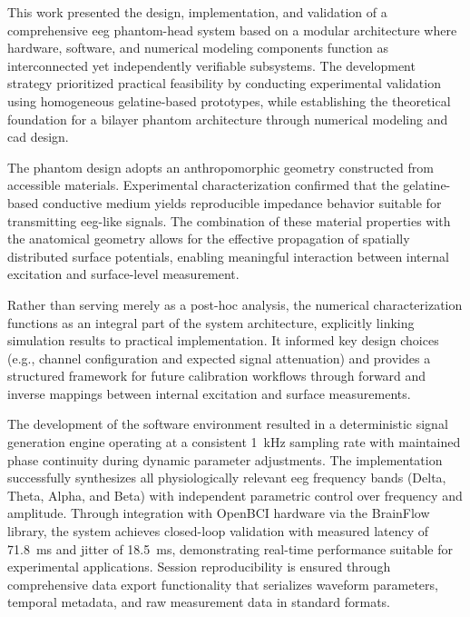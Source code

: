 \documentclass[../00_Main.tex]{subfiles}
\begin{document}
This work presented the design, implementation, and validation of a comprehensive \gls{eeg} phantom-head system based on a modular architecture where hardware, software, and numerical modeling components function as interconnected yet independently verifiable subsystems. The development strategy prioritized practical feasibility by conducting experimental validation using homogeneous gelatine-based prototypes, while establishing the theoretical foundation for a bilayer phantom architecture through numerical modeling and \gls{cad} design.

The phantom design adopts an anthropomorphic geometry constructed from accessible materials. Experimental characterization confirmed that the gelatine-based conductive medium yields reproducible impedance behavior suitable for transmitting \gls{eeg}-like signals. The combination of these material properties with the anatomical geometry allows for the effective propagation of spatially distributed surface potentials, enabling meaningful interaction between internal excitation and surface-level measurement.

Rather than serving merely as a post-hoc analysis, the numerical characterization functions as an integral part of the system architecture, explicitly linking simulation results to practical implementation. It informed key design choices (e.g., channel configuration and expected signal attenuation) and provides a structured framework for future calibration workflows through forward and inverse mappings between internal excitation and surface measurements.

The development of the software environment resulted in a deterministic signal generation engine operating at a consistent 1~kHz sampling rate with maintained phase continuity during dynamic parameter adjustments. The implementation successfully synthesizes all physiologically relevant \gls{eeg} frequency bands (Delta, Theta, Alpha, and Beta) with independent parametric control over frequency and amplitude. Through integration with OpenBCI hardware via the BrainFlow library, the system achieves closed-loop validation with measured latency of 71.8~ms and jitter of 18.5~ms, demonstrating real-time performance suitable for experimental applications. Session reproducibility is ensured through comprehensive data export functionality that serializes waveform parameters, temporal metadata, and raw measurement data in standard formats.
\end{document}
